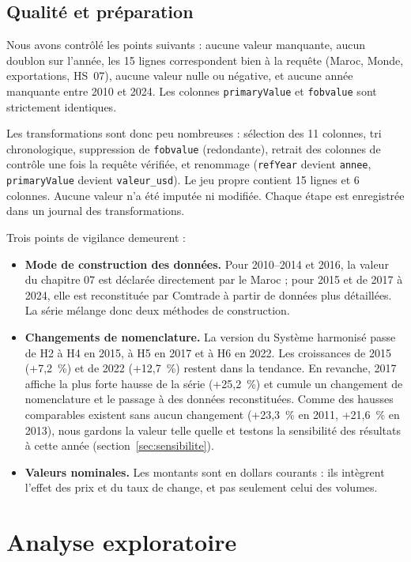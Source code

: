 \documentclass[11pt,a4paper]{article}
\begin{document}
\subsection{Qualité et préparation}
Nous avons contrôlé les points suivants : aucune valeur manquante, aucun doublon sur l'année, les 15 lignes correspondent bien à la requête (Maroc, Monde, exportations, HS~07), aucune valeur nulle ou négative, et aucune année manquante entre 2010 et 2024. Les colonnes \texttt{primaryValue} et \texttt{fobvalue} sont strictement identiques.

Les transformations sont donc peu nombreuses : sélection des 11 colonnes, tri chronologique, suppression de \texttt{fobvalue} (redondante), retrait des colonnes de contrôle une fois la requête vérifiée, et renommage (\texttt{refYear} devient \texttt{annee}, \texttt{primaryValue} devient \texttt{valeur\_usd}). Le jeu propre contient 15 lignes et 6 colonnes. Aucune valeur n'a été imputée ni modifiée. Chaque étape est enregistrée dans un journal des transformations.

Trois points de vigilance demeurent :
\begin{itemize}
\item \textbf{Mode de construction des données.} Pour 2010--2014 et 2016, la valeur du chapitre 07 est déclarée directement par le Maroc ; pour 2015 et de 2017 à 2024, elle est reconstituée par Comtrade à partir de données plus détaillées. La série mélange donc deux méthodes de construction.
\item \textbf{Changements de nomenclature.} La version du Système harmonisé passe de H2 à H4 en 2015, à H5 en 2017 et à H6 en 2022. Les croissances de 2015 (+7,2~\%) et de 2022 (+12,7~\%) restent dans la tendance. En revanche, 2017 affiche la plus forte hausse de la série (+25,2~\%) et cumule un changement de nomenclature et le passage à des données reconstituées. Comme des hausses comparables existent sans aucun changement (+23,3~\% en 2011, +21,6~\% en 2013), nous gardons la valeur telle quelle et testons la sensibilité des résultats à cette année (section~\ref{sec:sensibilite}).
\item \textbf{Valeurs nominales.} Les montants sont en dollars courants : ils intègrent l'effet des prix et du taux de change, et pas seulement celui des volumes.
\end{itemize}

\section{Analyse exploratoire}\label{sec:eda}
\end{document}
